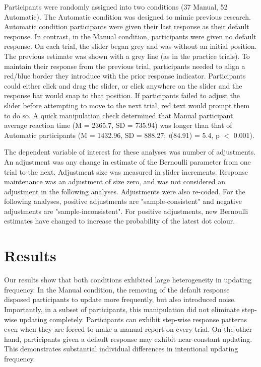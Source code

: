 \documentclass[sn-apa]{sn-jnl}\usepackage[]{graphicx}\usepackage[]{xcolor}
\begin{document}
Participants were randomly assigned into two conditions (37 Manual, 52 Automatic). The Automatic condition was designed to mimic previous research. Automatic condition participants were given their last response as their default response. In contrast, in the Manual condition, participants were given no default response. On each trial, the slider began grey and was without an initial position. The previous estimate was shown with a grey line (as in the practice trials). To maintain their response from the previous trial, participants needed to align a red/blue border they introduce with the prior response indicator. Participants could either click and drag the slider, or click anywhere on the slider and the response bar would snap to that position. If participants failed to adjust the slider before attempting to move to the next trial, red text would prompt them to do so. A quick manipulation check determined that Manual participant average reaction time (M = 2365.7, SD = 735.94) was longer than that of Automatic participants (M = 1432.96, SD = 888.27; \textit{t}(84.91) = 5.4, p \(<\) 0.001). 

The dependent variable of interest for these analyses was number of adjustments. An adjustment was any change in estimate of the Bernoulli parameter from one trial to the next. Adjustment size was measured in slider increments. Response maintenance was an adjustment of size zero, and was not considered an adjustment in the following analyses. Adjustments were also re-coded. For the following analyses, positive adjustments are "sample-consistent" and negative adjustments are "sample-inconsistent". For positive adjustments, new Bernoulli estimates have changed to increase the probability of the latest dot colour.

\section{Results}\label{sec-results}

Our results show that both conditions exhibited large heterogeneity in updating frequency. In the Manual condition, the removing of the default response disposed participants to update more frequently, but also introduced noise. Importantly, in a subset of participants, this manipulation did not eliminate step-wise updating completely. Participants can exhibit step-wise response patterns even when they are forced to make a manual report on every trial. On the other hand, participants given a default response may exhibit near-constant updating. This demonstrates substantial individual differences in intentional updating frequency.
\end{document}
